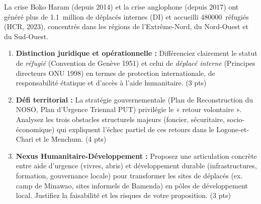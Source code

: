 \documentclass[11pt]{article}
\begin{document}
\begin{exercice}
\label{exo:crise}
La crise Boko Haram (depuis 2014) et la crise anglophone (depuis 2017) ont généré plus de \SI{1,1}{million} de déplacés internes (DI) et accueilli \SI{480000}{réfugiés} (HCR, 2023), concentrés dans les régions de l'Extrême-Nord, du Nord-Ouest et du Sud-Ouest.

\begin{enumerate}
    \item \textbf{Distinction juridique et opérationnelle :} Différenciez clairement le statut de \textit{réfugié} (Convention de Genève 1951) et celui de \textit{déplacé interne} (Principes directeurs ONU 1998) en termes de protection internationale, de responsabilité étatique et d'accès à l'aide humanitaire. (3 pts)
    \item \textbf{Défi territorial :} La stratégie gouvernementale (Plan de Reconstruction du NOSO, Plan d'Urgence Triennal PUT) privilégie le « retour volontaire ». Analysez les trois obstacles structurels majeurs (foncier, sécuritaire, socio-économique) qui expliquent l'échec partiel de ces retours dans le Logone-et-Chari et le Menchum. (4 pts)
    \item \textbf{Nexus Humanitaire-Développement :} Proposez une articulation concrète entre aide d'urgence (vivres, abris) et développement durable (infrastructures, formation, gouvernance locale) pour transformer les sites de déplacés (ex. camp de Minawao, sites informels de Bamenda) en pôles de développement local. Justifiez la faisabilité et les risques de votre proposition. (3 pts)
\end{enumerate}
\end{exercice}
\end{document}
